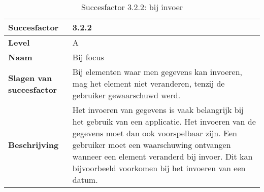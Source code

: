 \begin{table}[H]
    \centering
    \caption{Succesfactor 3.2.2: bij invoer}
    
    
    \hspace*{-1cm}\begin{tabular}{|l|p{12cm}|} 
        \hline
        \textbf{Succesfactor}                 & 3.2.2                                                                                                                                                                                                                                                                                                                                                                                                                                                                                                        \\ 
        \hline
        \textbf{Level}                        & A                                                                                                                                                                                                                                                                                                                                                                                                                                                                                                               \\ 
        \hline
        \textbf{Naam}                         & Bij focus~                                                                                                                                                                                                                                                                                                                                                                                                                                                                                      \\ 
        \hline
        \textbf{Slagen van succesfactor}      & Bij elementen waar men gegevens kan invoeren, mag het element niet veranderen, tenzij de gebruiker gewaarschuwd werd.
        \\  
        \hline
        \textbf{Beschrijving}                 & Het invoeren van gegevens is vaak belangrijk bij het gebruik van een applicatie. Het invoeren van de gegevens moet dan ook voorspelbaar zijn. Een gebruiker moet een waarschuwing ontvangen wanneer een element veranderd bij invoer. Dit kan bijvoorbeeld voorkomen bij het invoeren van een datum.  \\ 

\end{tabular}
\end{table}
